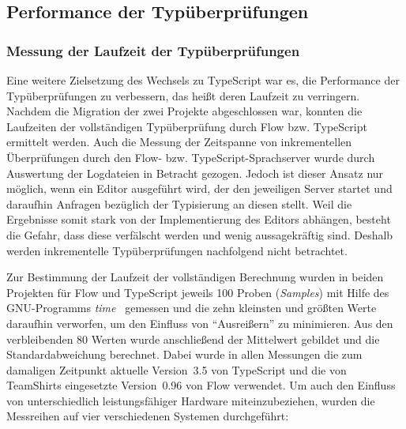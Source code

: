 \subsection{Performance der Typüberprüfungen}

\subsubsection{Messung der Laufzeit der Typüberprüfungen}

Eine weitere Zielsetzung des Wechsels zu TypeScript war es, die Performance der Typüberprüfungen zu verbessern, das heißt deren Laufzeit zu verringern. Nachdem die Migration der zwei Projekte abgeschlossen war, konnten die Laufzeiten der vollständigen Typüberprüfung durch Flow bzw. TypeScript ermittelt werden. Auch die Messung der Zeitspanne von inkrementellen Überprüfungen durch den Flow- bzw. TypeScript-Sprachserver wurde durch Auswertung der Logdateien in Betracht gezogen. Jedoch ist dieser Ansatz nur möglich, wenn ein Editor ausgeführt wird, der den jeweiligen Server startet und daraufhin Anfragen bezüglich der Typisierung an diesen stellt. Weil die Ergebnisse somit stark von der Implementierung des Editors abhängen, besteht die Gefahr, dass diese verfälscht werden und wenig aussagekräftig sind. Deshalb werden inkrementelle Typüberprüfungen nachfolgend nicht betrachtet.

Zur Bestimmung der Laufzeit der vollständigen Berechnung wurden in beiden Projekten für Flow und TypeScript jeweils 100 Proben (\textit{Samples}) mit Hilfe des GNU-Programms \textit{time}~\autocite{GNU_TIME} gemessen und die zehn kleinsten und größten Werte daraufhin verworfen, um den Einfluss von \enquote{Ausreißern} zu minimieren. Aus den verbleibenden 80 Werten wurde anschließend der Mittelwert gebildet und die Standardabweichung berechnet. Dabei wurde in allen Messungen die zum damaligen Zeitpunkt aktuelle Version~3.5 von TypeScript und die von TeamShirts eingesetzte Version~0.96 von Flow verwendet. Um auch den Einfluss von unterschiedlich leistungsfähiger Hardware miteinzubeziehen, wurden die Messreihen auf vier verschiedenen Systemen durchgeführt:

